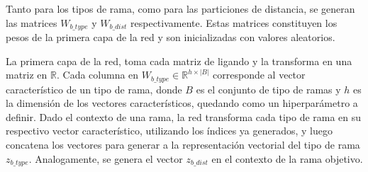 Tanto para los tipos de rama, como para las particiones de distancia, se
generan las matrices $W_{b\_type}$ y $W_{b\_dist}$ respectivamente. Estas
matrices constituyen los pesos de la primera capa de la red y son
inicializadas con valores aleatorios.


La primera capa de la red, toma cada matriz de ligando y la transforma
en una matriz en $\mathbb{R}$. Cada columna en $W_{b\_type} \in
\mathbb{R}^{h\times |B|}$ corresponde al vector característico de un
tipo de rama, donde $B$ es el conjunto de tipo de ramas y $h$ es la
dimensión de los vectores característicos, quedando como un
hiperparámetro a definir.  Dado el contexto de una rama, la red
transforma cada tipo de rama en su respectivo vector característico,
utilizando los índices ya generados, y luego concatena los vectores
para generar a la representación vectorial del tipo de rama
$z_{b\_type}$. Analogamente, se genera el vector $z_{b\_dist}$ en el
contexto de la rama objetivo.

